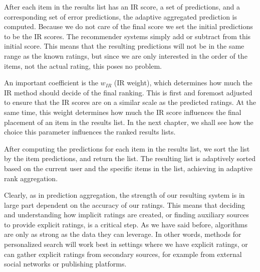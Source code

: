 After each item in the results list has an IR score, a set of predictions, and a corresponding set of 
error predictions, the adaptive aggregated prediction is computed. 
Because we do not care of the final score we set the initial predictions to be the IR scores.
The recommender systems simply add or subtract from this initial score.
This means that the resulting predictions will not be in the same range as the known ratings,
but since we are only interested in the order of the items, not the actual rating, this poses no problem.

An important coefficient is the $w_{IR}$ (IR weight),
which determines how much the IR method should decide of the final ranking.
This is first and foremost adjusted to ensure that the IR scores
are on a similar scale as the predicted ratings.
At the same time, this weight determines how 
much the IR score influences the final placement of an item in the results list.
In the next chapter, we shall see how the choice this parameter 
influences the ranked results lists.

After computing the predictions for each item in the results list, 
we sort the list by the item predictions, and return the list.
The resulting list is adaptively sorted based on the current user and the specific items in the list,
achieving in adaptive rank aggregation.

Clearly, as in prediction aggregation, the strength of our resulting system is in large part dependent on the accuracy of our ratings.
This means that deciding and understanding how implicit ratings are created, or 
finding auxiliary sources to provide explicit ratings, is a critical step.
As we have said before, algorithms are only as strong as the data they can leverage.
In other words, methods for personalized search will work best in settings where we have explicit ratings,
or can gather explicit ratings from secondary sources, for example from external social networks or publishing platforms.


